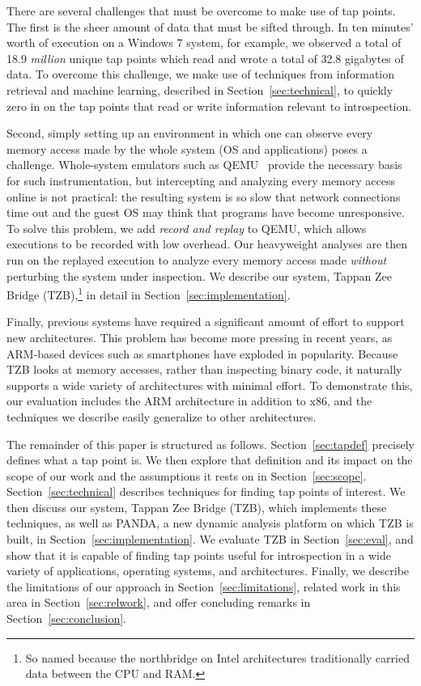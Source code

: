 There are several challenges that must be overcome to make use of tap
points. The first is the sheer amount of data that must be sifted
through. In ten minutes' worth of execution on a Windows 7 system, for
example, we observed a total of 18.9 \emph{million} unique tap points
which read and wrote a total of 32.8 gigabytes of data. To overcome this
challenge, we make use of techniques from information retrieval and
machine learning, described in Section~\ref{sec:technical}, to quickly
zero in on the tap points that read or write information relevant to
introspection.

Second, simply setting up an environment in which one can observe every
memory access made by the whole system (OS and applications) poses a
challenge. Whole-system emulators such as QEMU~\cite{Bellard:2005}
provide the necessary basis for such instrumentation, but intercepting
and analyzing every memory access online is not practical: the resulting
system is so slow that network connections time out and the guest OS may
think that programs have become unresponsive. To solve this problem, we
add \emph{record and replay} to QEMU, which allows executions to be
recorded with low overhead. Our heavyweight analyses are then run on
the replayed execution to analyze every memory access made
\emph{without} perturbing the system under inspection. We describe our
system, Tappan Zee Bridge (TZB),\footnote{So named because the
northbridge on Intel architectures traditionally carried data between
the CPU and RAM.} in detail in Section~\ref{sec:implementation}.

Finally, previous systems have required a significant amount of effort
to support new architectures. This problem has become more pressing in
recent years, as ARM-based devices such as smartphones have exploded in
popularity. Because TZB looks at memory accesses, rather than inspecting
binary code, it naturally supports a wide variety of architectures with
minimal effort. To demonstrate this, our evaluation includes the ARM
architecture in addition to x86, and the techniques we describe easily
generalize to other architectures.

The remainder of this paper is structured as follows.
Section~\ref{sec:tapdef} precisely defines what a tap point is. We then
explore that definition and its impact on the scope of our work and the
assumptions it rests on in Section~\ref{sec:scope}.
Section~\ref{sec:technical} describes techniques for finding tap points
of interest. We then discuss our system, Tappan Zee Bridge (TZB), which
implements these techniques, as well as PANDA, a new dynamic analysis
platform on which TZB is built, in Section~\ref{sec:implementation}. We
evaluate TZB in Section~\ref{sec:eval}, and show that it is capable of
finding tap points useful for introspection in a wide variety of
applications, operating systems, and architectures. Finally, we describe
the limitations of our approach in Section~\ref{sec:limitations},
related work in this area in Section~\ref{sec:relwork}, and offer
concluding remarks in Section~\ref{sec:conclusion}.
